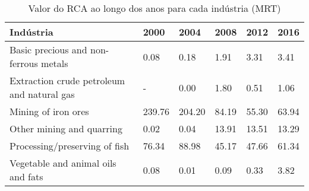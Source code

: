 \begin{table}
\centering
\caption{Valor do RCA ao longo dos anos para cada indústria (MRT)}
\begin{tabular}{p{6cm}p{1.5cm}p{1.5cm}p{1.5cm}p{1.5cm}p{1.5cm}}
\toprule
                                 Indústria &   2000 &   2004 &  2008 &  2012 &  2016 \\
\midrule
     Basic precious and non-ferrous metals &   0.08 &   0.18 &  1.91 &  3.31 &  3.41 \\
Extraction crude petroleum and natural gas &      - &   0.00 &  1.80 &  0.51 &  1.06 \\
                       Mining of iron ores & 239.76 & 204.20 & 84.19 & 55.30 & 63.94 \\
                 Other mining and quarring &   0.02 &   0.04 & 13.91 & 13.51 & 13.29 \\
             Processing/preserving of fish &  76.34 &  88.98 & 45.17 & 47.66 & 61.34 \\
        Vegetable and animal oils and fats &   0.08 &   0.01 &  0.09 &  0.33 &  3.82 \\
\bottomrule
\end{tabular}
\end{table}
